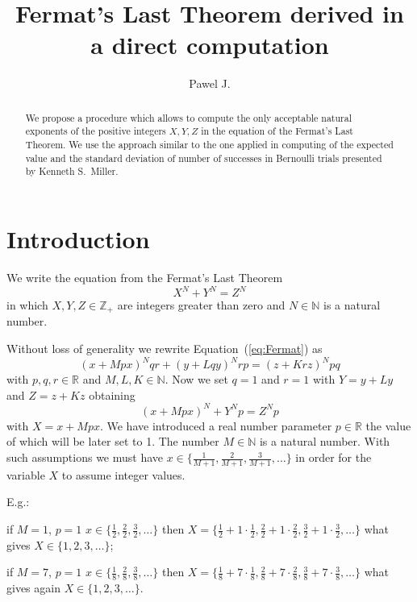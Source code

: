 \documentclass[SecEq,CM,GP]{degruyter-crelle} %
\title[FLT derived in a direct computation]{Fermat's Last Theorem derived in a direct computation}
\author{Pawel J.}{Piskorz}{}{Krakow}
\theoremstyle{plain}
\theoremstyle{definition}
\begin{document}
\begin{abstract}
    We propose a procedure which allows to compute the only acceptable natural
    exponents of the positive integers $X, Y, Z$
    in the equation of the Fermat's Last Theorem. 
    We use the approach similar to the one applied in
    computing of the expected value and the standard deviation of number of successes in Bernoulli 
    trials presented by Kenneth S.~Miller.
\end{abstract}



\section{Introduction}\label{sec:intro}

We write the equation from the Fermat's Last Theorem~\cite{FLT_Wikipedia}
\begin{equation}
\label{eq:Fermat}
X^N + Y^N = Z^N
\end{equation}
in which
$X, Y, Z \in \mathbb{Z_{+}}$ are integers
greater than zero
and $N \in \mathbb{N}$ is a natural number.

Without loss of generality we rewrite Equation~(\ref{eq:Fermat}) as
\begin{equation}
  \label{eq:FermatGeneralEquation}
  (x + Mpx)^{N} qr + (y + Lqy)^{N} rp = (z + Krz)^{N} pq
  \end{equation}
with $p, q, r \in \mathbb{R}$
and $M, L, K \in \mathbb{N}$\@.
Now we set $q=1$ and $r=1$
with $Y = y + Ly$ and $Z = z + Kz$
obtaining
\begin{equation}
\label{eq:FermatEquation}
(x + Mpx)^N + Y^N p = Z^N p
\end{equation}
with $X=x + Mpx$.
We have introduced a real number parameter $p \in \mathbb{R}$ the value of which will 
be later set to 1\@.
The number $M \in \mathbb{N}$ is a natural number.
With such assumptions we must have $x \in \{ \frac{1}{M+1}, \frac{2}{M+1}, \frac{3}{M+1}, \ldots \}$
in order for the variable $X$ to assume integer values.

E.g.:

if $M=1$, $p=1$ $x \in \{ \frac{1}{2}, \frac{2}{2}, \frac{3}{2}, \ldots \}$
 then $X = \{\frac{1}{2} + 1 \cdot \frac{1}{2}, \frac{2}{2} + 1 \cdot \frac{2}{2}, \frac{3}{2} + 1 \cdot \frac{3}{2}, \ldots \}$
what gives 
$X \in \{1, 2, 3, \ldots \}$;

if $M=7$, $p=1$ $x \in \{ \frac{1}{8}, \frac{2}{8}, \frac{3}{8}, \ldots \}$
 then $X = \{\frac{1}{8} + 7 \cdot \frac{1}{8}, \frac{2}{8} + 7 \cdot \frac{2}{8}, \frac{3}{8} + 7 \cdot \frac{3}{8}, \ldots \}$
what gives again
$X \in \{1, 2, 3, \ldots \}$\@.
\end{document}
